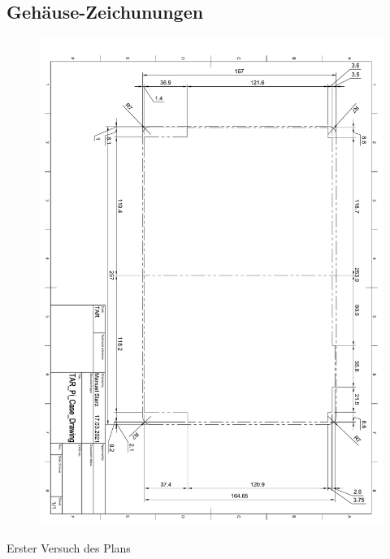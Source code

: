 \subsection{Gehäuse-Zeichunungen}
\begin{figure}[ht!]
	\includegraphics*[width=1\textwidth, page=1]{pdf/gehäuse_zeichnung_fußabdruck_v1.pdf}
 	\label{case_footprint}
\end{figure}
\begin{center}
Erster Versuch des Plans
\end{center}
